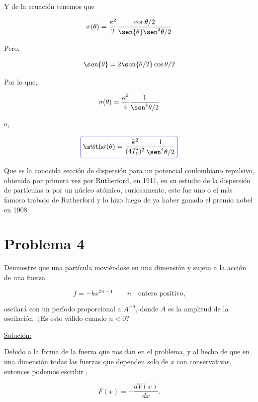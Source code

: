 \documentclass[a4paper,10pt]{article}
\makeatletter
\numberwithin{equation}{section}
\newcommand*{\boxcolor}{blue}
\renewcommand{\boxed}[1]{\textcolor{\boxcolor}{%
\tikz[baseline={([yshift=-1ex]current bounding box.center)}] \node [rectangle, minimum width=1ex,rounded corners,draw] {\normalcolor\m@th$\displaystyle#1$};}}
\makeatother
\begin{document}
Y de la ecuación  tenemos que 

\begin{equation}
 \sigma (\theta) = \frac{\kappa^2}{2}\frac{\cot{\theta/2}}{\sen{\theta}\sen^2{\theta/2}}
\end{equation}

Pero,

\begin{equation}
 \sen{\theta} = 2\sen{\theta/2}\cos{\theta/2}
\end{equation}

Por lo que,

\begin{equation}
  \sigma (\theta) = \frac{\kappa^2}{4}\frac{1}{\sen^4{\theta/2}}
\end{equation}

o,

\begin{equation}
 \boxed{\sigma (\theta) = \frac{k^2}{(4T_0')^2}\frac{1}{\sen^4{\theta/2}}}
\end{equation}

Que es la conocida sección de dispersión para un potencial coulombiano repulsivo,
obtenida por primera vez por Rutherford, en 1911, en su estudio de la dispersión de 
partículas $\alpha$ por un núcleo atómico, curiosamente, este fue uno o el más famoso
trabajo de Rutherford y lo hizo luego de ya haber ganado el premio nobel en 1908.

\section{Problema 4}

Demuestre que una partícula moviéndose en una dimensión y sujeta a la 
acción de una fuerza 

$$ 
f = -kx^{2n+1} \qquad n \quad \text{entero positivo,}
$$

oscilará con un período proporcional a $A^{-n}$, donde $A$ es la amplitud 
de la oscilación. ¿Es esto válido cuando $n<0$?

\vspace{.3cm}

\underline{Solución:} \vspace{.3cm}

Debido a la forma de la fuerza que nos dan en el problema, y al hecho de que en una 
dimensión todas las fuerzas que dependen solo de $x$ con conservativas, entonces 
podemos escribir \cite{saletan},

\begin{equation}
 F(x) = - \frac{dV(x)}{dx}.
 \label{eq:potencial1}
\end{equation}
\end{document}
